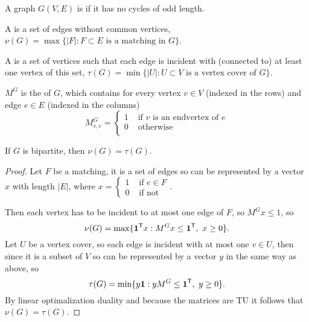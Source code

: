 \documentclass{exam}
\begin{document}
    \begin{define}
        A graph $G(V,E)$ is  if it has no cycles of odd length.

        A  is a set of edges without common vertices, $\nu (G) = \max \{ |F| : F \subset E \text{ is a matching in } G \}$.

        A  is a set of vertices such that each edge is incident with (connected to) at least one vertex of this set, $\tau (G) = \min \{ |U|: U \subset V \text{ is a vertex cover of } G \}$.

        $M^G$ is the  of $G$, which contains for every vertex $v \in V$ (indexed in the rows) and edge $e \in E$ (indexed in the columns)
        \[
            M_{v,e}^G =
            \begin{cases}
                1 & \text{ if $v$ is an endvertex of $e$} \\
                0 & \text { otherwise } \\
            \end{cases}
        \]
    \end{define}
    \begin{theorem}
        If $G$ is bipartite, then $\nu (G) = \tau (G)$.
    \end{theorem}
    \begin{proof}
        Let $F$ be a matching, it is a set of edges so can be represented by a vector $x$ with length $|E|$, where $x = \begin{cases} 1 & \text{ if } e \in F \\ 0 & \text{ if not } \end{cases}$.

        Then each vertex has to be incident to at most one edge of $F$, so $M^G x \le 1$, so
        \[
            \nu (G) = \max \{ {\textbf{1}}^{\mathsf{T}} x : M^G x \le {\textbf{1}}^{\mathsf{T}},\ x \ge 0 \}.
        \]
        Let $U$ be a vertex cover, so each edge is incident with at most one $v \in U$, then since it is a subset of $V$ so can be represented by a vector $y$ in the same way as above, so
        \[
            \tau (G) = \min \{ y {\textbf{1}} : y M^G \le {\textbf{1}}^{\mathsf{T}},\ y \ge 0 \}.
        \]
        By linear optimalization duality and because the matrices are TU it follows that $\nu (G) = \tau (G)$.
    \end{proof}
\end{document}
